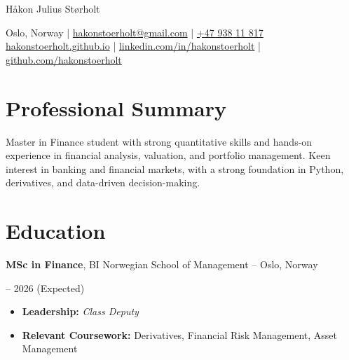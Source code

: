 \documentclass[10pt, letterpaper]{article}
\newenvironment{highlights}{
    \begin{itemize}[
        topsep=0.1 cm, parsep=0.1 cm, partopsep=0pt,
        itemsep=0.05 cm, %
        leftmargin=0 cm
    ]
}{
    \end{itemize}
}
\newenvironment{onecolentry}{\par\addvspace{0.1cm}}{\par\addvspace{0.1cm}}
\newenvironment{twocolentry}[2][]{
    \def\secondColumn{#2}
    \setcolumnwidth{\fill, 4.5 cm}
    \begin{paracol}{2}
}{
    \switchcolumn \raggedleft \secondColumn
    \end{paracol}
}
\newenvironment{header}{
    \centering\linespread{1.2}
}{
    \par
}
\begin{document}
    \begin{header}
        \fontsize{25 pt}{25 pt}\selectfont Håkon Julius Størholt

        \vspace{5 pt}

        \normalsize
        \faMapMarker* \kern 2pt Oslo, Norway \kern 4pt | \kern 4pt
        \href{mailto:hakonstoerholt@gmail.com}{\faEnvelope \kern 2pt hakonstoerholt@gmail.com} \kern 4pt | \kern 4pt
        \href{tel:+47 938 11 817}{\faPhone \kern 2pt +47 938 11 817} \\
        \href{https://hakonstoerholt.github.io}{\faGlobe \kern 2pt hakonstoerholt.github.io} \kern 4pt | \kern 4pt
        \href{https://linkedin.com/in/hakonstoerholt}{\faLinkedin \kern 2pt linkedin.com/in/hakonstoerholt} \kern 4pt | \kern 4pt
        \href{https://github.com/hakonstoerholt}{\faGithub \kern 2pt github.com/hakonstoerholt}
    \end{header}

    \vspace{-0.1cm} %

\section{Professional Summary}
\begin{onecolentry}
    Master in Finance student with strong quantitative skills and hands-on experience in financial analysis, valuation, and portfolio management. Keen interest in banking and financial markets, with a strong foundation in Python, derivatives, and data-driven decision-making.
\end{onecolentry}

\section{Education}
\begin{twocolentry}{2024 -- 2026 (Expected)}
    \textbf{MSc in Finance}, BI Norwegian School of Management -- Oslo, Norway
\end{twocolentry}
\begin{onecolentry}
\begin{highlights}
    \setlength\itemindent{2em} %
    \item \textbf{Leadership:} \textit{Class Deputy}
    \item \textbf{Relevant Coursework:} Derivatives, Financial Risk Management, Asset Management
\end{highlights}

\end{onecolentry}
\end{document}
